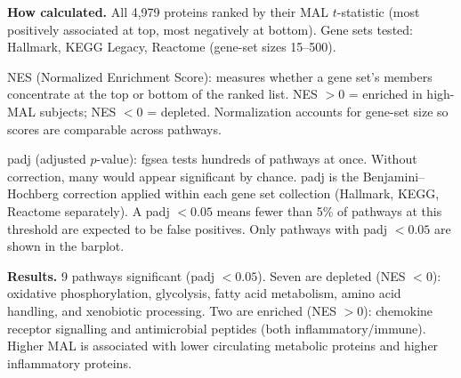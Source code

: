 \documentclass[11pt, letterpaper]{article}
\begin{document}
\textbf{How calculated.}
All 4,979 proteins ranked by their MAL $t$-statistic (most positively
associated at top, most negatively at bottom). Gene sets tested:
Hallmark, KEGG Legacy, Reactome (gene-set sizes 15--500).

NES (Normalized Enrichment Score): measures whether a gene set's
members concentrate at the top or bottom of the ranked list.
NES $> 0$ = enriched in high-MAL subjects; NES $< 0$ = depleted.
Normalization accounts for gene-set size so scores are comparable
across pathways.

padj (adjusted $p$-value): fgsea tests hundreds of pathways at once.
Without correction, many would appear significant by chance. padj is
the Benjamini--Hochberg correction applied within each gene set
collection (Hallmark, KEGG, Reactome separately). A padj $< 0.05$
means fewer than 5\% of pathways at this threshold are expected to be
false positives. Only pathways with padj $< 0.05$ are shown in the
barplot.

\textbf{Results.} 9 pathways significant (padj $< 0.05$). Seven are
depleted (NES $< 0$): oxidative phosphorylation, glycolysis, fatty
acid metabolism, amino acid handling, and xenobiotic processing. Two
are enriched (NES $> 0$): chemokine receptor signalling and
antimicrobial peptides (both inflammatory/immune). Higher MAL is
associated with lower circulating metabolic proteins and higher
inflammatory proteins.
\end{document}
